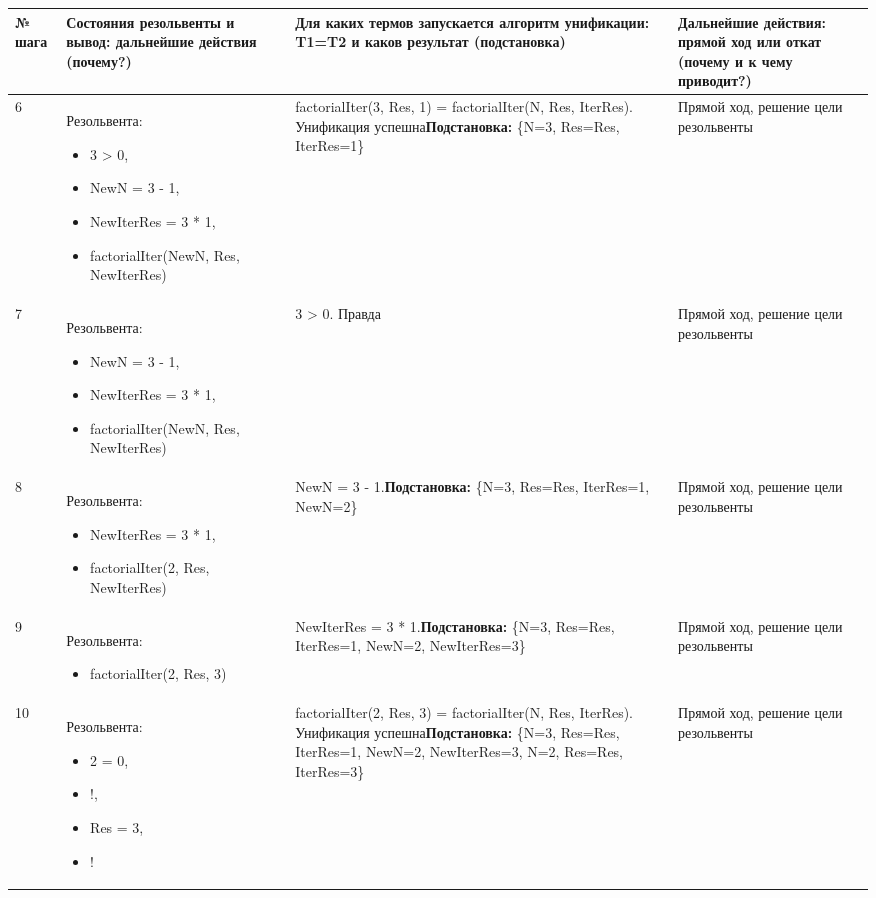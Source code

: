 \documentclass[14pt,a4paper]{scrreprt}
\begin{document}
\begin{table}[H]
	\begin{tabular}{|p{0.8cm\small}|p{4.7cm\small}|p{5.7cm\small}|p{4cm\small}|}	
		\hline
		№ шага & Состояния резольвенты и вывод: дальнейшие действия (почему?) & Для каких термов запускается алгоритм унификации: T1=T2 и каков результат (подстановка) & Дальнейшие действия: прямой ход или откат (почему и к чему приводит?)\\
		\hline
		6 & Резольвента:\begin{itemize} \item 3 > 0, \item NewN = 3 - 1, 
			\item NewIterRes = 3 * 1,
\item factorialIter(NewN, Res, NewIterRes) \end{itemize} & factorialIter(3, Res, 1) = factorialIter(N, Res, IterRes). Унификация успешна\linebreak \textbf{Подстановка:} \{N=3, Res=Res, IterRes=1\} & Прямой ход, решение цели резольвенты\\
		\hline
		7 & Резольвента:\begin{itemize} \item NewN = 3 - 1, 
		\item NewIterRes = 3 * 1,
\item factorialIter(NewN, Res, NewIterRes) \end{itemize} & 3 > 0. Правда & Прямой ход, решение цели резольвенты\\
	 	\hline
	 	8 & Резольвента:\begin{itemize} \item NewIterRes = 3 * 1,
\item factorialIter(2, Res, NewIterRes) \end{itemize} & NewN = 3 - 1.\linebreak \textbf{Подстановка:} \{N=3, Res=Res, IterRes=1, NewN=2\} & Прямой ход, решение цели резольвенты\\
	 	\hline
	 	9 & Резольвента:\begin{itemize} \item factorialIter(2, Res, 3) \end{itemize} & NewIterRes = 3 * 1.\linebreak \textbf{Подстановка:} \{N=3, Res=Res, IterRes=1, NewN=2, NewIterRes=3\} & Прямой ход, решение цели резольвенты\\
		\hline
		10 & Резольвента:\begin{itemize} \item  2 = 0, \item !, \item Res = 3, \item ! \end{itemize} & factorialIter(2, Res, 3) = factorialIter(N, Res, IterRes). Унификация успешна\linebreak \textbf{Подстановка:} \{N=3, Res=Res, IterRes=1, NewN=2, NewIterRes=3, N=2, Res=Res, IterRes=3\} & Прямой ход, решение цели резольвенты\\
		\hline
	\end{tabular}
\end{table}
\end{document}
